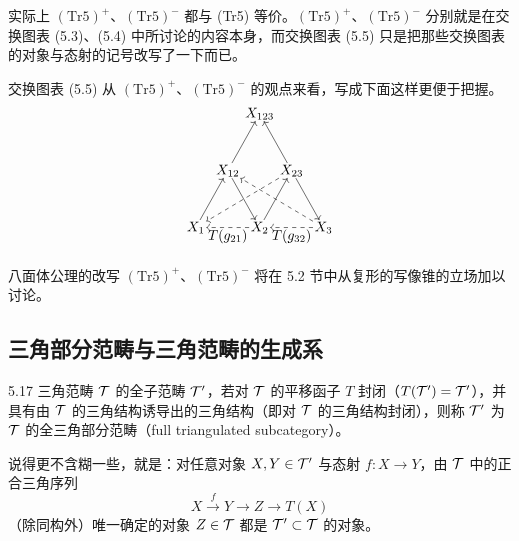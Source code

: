 
实际上 $(\mathrm{Tr}5)^+$、$(\mathrm{Tr}5)^-$ 都与 (Tr5) 等价。$(\mathrm{Tr}5)^+$、$(\mathrm{Tr}5)^-$ 分别就是在交换图表 (5.3)、(5.4) 中所讨论的内容本身，而交换图表 (5.5) 只是把那些交换图表的对象与态射的记号改写了一下而已。

交换图表 (5.5) 从 $(\mathrm{Tr}5)^+$、$(\mathrm{Tr}5)^-$ 的观点来看，写成下面这样更便于把握。
\[
\begin{tikzpicture}[scale=0.95, every node/.style={inner sep=1pt}]
\node (X123) at (1.70,3.00) {$X_{123}$};
\node (X12) at (0.85,1.50) {$X_{12}$};
\node (X23) at (2.55,1.50) {$X_{23}$};
\node (X1) at (0,0) {$X_1$};
\node (X2) at (1.70,0) {$X_2$};
\node (X3) at (3.40,0) {$X_3$};
\draw[->] (X12) -- (X123);
\draw[->] (X23) -- (X123);
\draw[->] (X1) -- (X12);
\draw[->] (X12) -- (X2);
\draw[->] (X2) -- (X23);
\draw[->] (X23) -- (X3);
\draw[->,dashed] (X3) -- (X12);
\draw[->,dashed] (X23) -- (X1);
\draw[->,dashed] (X2) -- node[below] {$T(g_{21})$} (X1);
\draw[->,dashed] (X3) -- node[below] {$T(g_{32})$} (X2);
\end{tikzpicture}
\]

八面体公理的改写 $(\mathrm{Tr}5)^+$、$(\mathrm{Tr}5)^-$ 将在 5.2 节中从复形的写像锥的立场加以讨论。

\subsection{三角部分范畴与三角范畴的生成系}

\begin{definition}{5.17}
三角范畴 $\mathcal{T}$ 的全子范畴 $\mathcal{T}'$，若对 $\mathcal{T}$ 的平移函子 $T$ 封闭（$T(\mathcal{T}')=\mathcal{T}'$），并具有由 $\mathcal{T}$ 的三角结构诱导出的三角结构（即对 $\mathcal{T}$ 的三角结构封闭），则称 $\mathcal{T}'$ 为 $\mathcal{T}$ 的全三角部分范畴（full triangulated subcategory）。
\end{definition}

说得更不含糊一些，就是：对任意对象 $X,Y\in\mathcal{T}'$ 与态射 $f\colon X\to Y$，由 $\mathcal{T}$ 中的正合三角序列
\[
X\xrightarrow{\,f\,} Y\to Z\to T(X)
\]
（除同构外）唯一确定的对象 $Z\in\mathcal{T}$ 都是 $\mathcal{T}'\subset\mathcal{T}$ 的对象。

